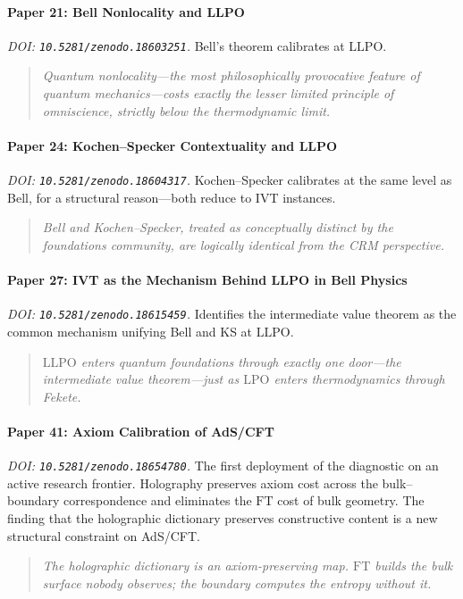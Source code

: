 \documentclass[11pt,a4paper]{report}
\theoremstyle{plain}
\theoremstyle{definition}
\theoremstyle{remark}
\newcommand{\LLPO}{\mathrm{LLPO}}
\newcommand{\LPO}{\mathrm{LPO}}
\newcommand{\FT}{\mathrm{FT}}
\begin{document}
\paragraph{Paper 21: Bell Nonlocality and LLPO}
\emph{DOI: \texttt{10.5281/zenodo.18603251}.}\quad
Bell's theorem calibrates at $\LLPO$.
\begin{quote}\itshape
Quantum nonlocality---the most philosophically provocative feature of quantum mechanics---costs exactly the lesser limited principle of omniscience, strictly below the thermodynamic limit.
\end{quote}

\paragraph{Paper 24: Kochen--Specker Contextuality and LLPO}
\emph{DOI: \texttt{10.5281/zenodo.18604317}.}\quad
Kochen--Specker calibrates at the same level as Bell, for a structural reason---both reduce to IVT instances.
\begin{quote}\itshape
Bell and Kochen--Specker, treated as conceptually distinct by the foundations community, are logically identical from the CRM perspective.
\end{quote}

\paragraph{Paper 27: IVT as the Mechanism Behind LLPO in Bell Physics}
\emph{DOI: \texttt{10.5281/zenodo.18615459}.}\quad
Identifies the intermediate value theorem as the common mechanism unifying Bell and KS at $\LLPO$.
\begin{quote}\itshape
$\LLPO$ enters quantum foundations through exactly one door---the intermediate value theorem---just as $\LPO$ enters thermodynamics through Fekete.
\end{quote}

\paragraph{Paper 41: Axiom Calibration of AdS/CFT}
\emph{DOI: \texttt{10.5281/zenodo.18654780}.}\quad
The first deployment of the diagnostic on an active research frontier.  Holography preserves axiom cost across the bulk--boundary correspondence and eliminates the $\FT$ cost of bulk geometry.  The finding that the holographic dictionary preserves constructive content is a new structural constraint on AdS/CFT.
\begin{quote}\itshape
The holographic dictionary is an axiom-preserving map.  $\FT$ builds the bulk surface nobody observes; the boundary computes the entropy without it.
\end{quote}
\end{document}
